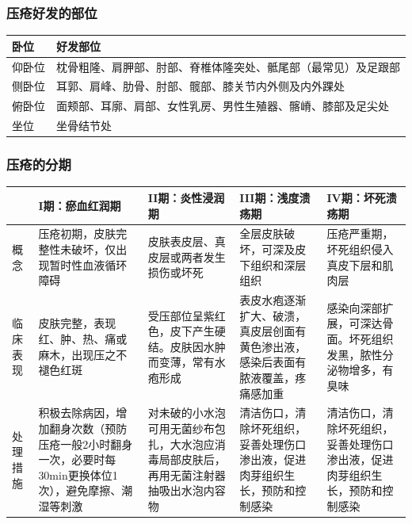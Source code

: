 \documentclass[11pt, a4paper]{ctexart}
\begin{document}
\subsubsection{压疮好发的部位}
\begin{table}[htbp]
\centering
\begin{tabular}{|l|l|}
\hline
\textbf{卧位} & \textbf{好发部位} \\
\hline
仰卧位 & 枕骨粗隆、肩胛部、肘部、脊椎体隆突处、骶尾部（最常见）及足跟部 \\
侧卧位 & 耳郭、肩峰、肋骨、肘部、髋部、膝关节内外侧及内外踝处 \\
俯卧位 & 面颊部、耳廓、肩部、女性乳房、男性生殖器、髂嵴、膝部及足尖处 \\
坐位 & 坐骨结节处 \\
\hline
\end{tabular}
\end{table}

\subsubsection{压疮的分期}
\begin{table}[htbp]
\centering
\begin{tabular}{|p{2cm}|p{3cm}|p{3cm}|p{3cm}|p{3cm}|}
\hline
 & \textbf{I期：瘀血红润期} & \textbf{II期：炎性浸润期} & \textbf{III期：浅度溃疡期} & \textbf{IV期：坏死溃疡期} \\
\hline
概念 & 压疮初期，皮肤完整性未破坏，仅出现暂时性血液循环障碍 & 皮肤表皮层、真皮层或两者发生损伤或坏死 & 全层皮肤破坏，可深及皮下组织和深层组织 & 压疮严重期，坏死组织侵入真皮下层和肌肉层 \\
\hline
临床表现 & 皮肤完整，表现红、肿、热、痛或麻木，出现压之不褪色红斑 & 受压部位呈紫红色，皮下产生硬结。皮肤因水肿而变薄，常有水疱形成 & 表皮水疱逐渐扩大、破溃，真皮层创面有黄色渗出液，感染后表面有脓液覆盖，疼痛感加重 & 感染向深部扩展，可深达骨面。坏死组织发黑，脓性分泌物增多，有臭味 \\
\hline
处理措施 & 积极去除病因，增加翻身次数（预防压疮一般2小时翻身一次，必要时每30min更换体位1次），避免摩擦、潮湿等刺激 & 对未破的小水泡可用无菌纱布包扎，大水泡应消毒局部皮肤后，再用无菌注射器抽吸出水泡内容物 & 清洁伤口，清除坏死组织，妥善处理伤口渗出液，促进肉芽组织生长，预防和控制感染 & 清洁伤口，清除坏死组织，妥善处理伤口渗出液，促进肉芽组织生长，预防和控制感染 \\
\hline
\end{tabular}
\end{table}
\end{document}
